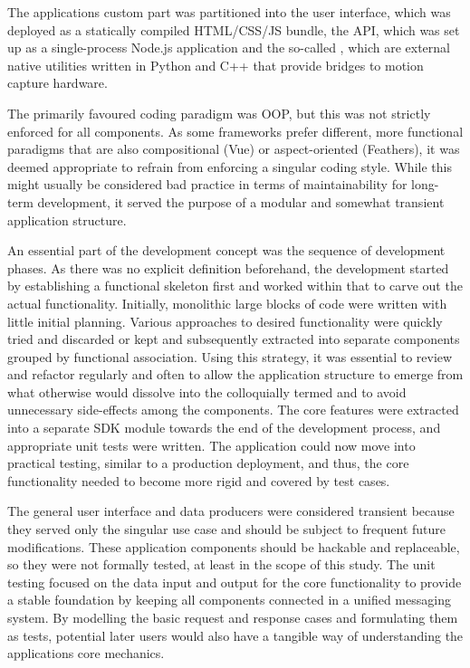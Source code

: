 The application\textquotesingle s custom part was partitioned into the user interface, which was deployed as a statically compiled \ac{HTML}/\ac{CSS}/\ac{JS} bundle, the \ac{API}, which was set up as a single-process Node.js application and the so-called , which are external native utilities written in Python and C++ that provide bridges to motion capture hardware.

The primarily favoured coding paradigm was \ac{OOP}, but this was not strictly enforced for all components.
As some frameworks prefer different, more functional paradigms that are also compositional (Vue) or aspect-oriented (Feathers), it was deemed appropriate to refrain from enforcing a singular coding style.
While this might usually be considered bad practice in terms of maintainability for long-term development, it served the purpose of a modular and somewhat transient  application structure.

An essential part of the development concept was the sequence of development phases.
As there was no explicit definition beforehand, the development started by establishing a functional skeleton first and worked within that to carve out the actual functionality.
Initially, monolithic large blocks of code were written with little initial planning.
Various approaches to desired functionality were quickly tried and discarded or kept and subsequently extracted into separate components grouped by functional association.
Using this strategy, it was essential to review and refactor regularly and often to allow the application structure to emerge from what otherwise would dissolve into the colloquially termed  and to avoid unnecessary side-effects among the components.
The core features were extracted into a separate \ac{SDK} module towards the end of the development process, and appropriate unit tests were written.
The application could now move into practical testing, similar to a production deployment, and thus, the core functionality needed to become more rigid and covered by test cases.

The general user interface and data producers were considered transient because they served only the singular use case and should be subject to frequent future modifications.
These application components should be hackable and replaceable, so they were not formally tested, at least in the scope of this study.
The unit testing focused on the data input and output for the core functionality to provide a stable foundation by keeping all components connected in a unified messaging system.
By modelling the basic request and response cases and formulating them as tests, potential later users would also have a tangible way of understanding the application\textquotesingle s core mechanics.


